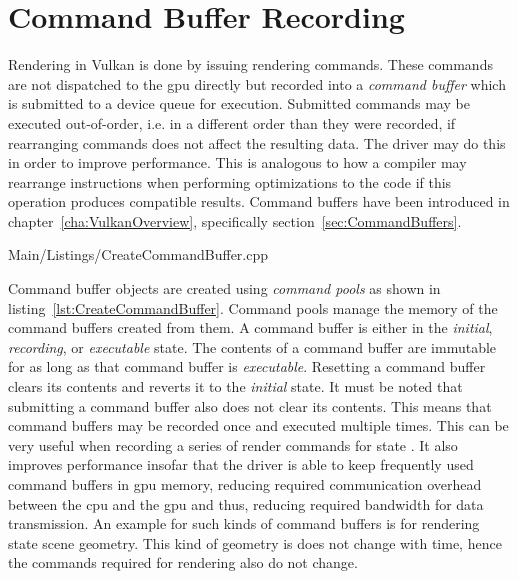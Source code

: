   \section{Command Buffer Recording}
  \label{sec:BuildCommandBuffers}
    Rendering in Vulkan is done by issuing rendering commands.
    These commands are not dispatched to the \gls{gpu} directly but recorded into a \textit{command buffer} which is submitted to a device queue for execution.
    Submitted commands may be executed out-of-order, i.e. in a different order than they were recorded, if rearranging commands does not affect the resulting data.
    The \gls{driver} may do this in order to improve performance.
    This is analogous to how a compiler may rearrange instructions when performing optimizations to the code if this operation produces compatible results.
    Command buffers have been introduced in chapter~\ref{cha:VulkanOverview}, specifically section~\ref{sec:CommandBuffers}.

    
    {Main/Listings/CreateCommandBuffer.cpp}

    Command buffer objects are created using \textit{command pools} as shown in listing~\ref{lst:CreateCommandBuffer}.
    Command pools manage the memory of the command buffers created from them.
    A command buffer is either in the \textit{initial}, \textit{recording}, or \textit{executable} state.
    The contents of a command buffer are immutable for as long as that command buffer is \textit{executable}.
    Resetting a command buffer clears its contents and reverts it to the \textit{initial} state.
    It must be noted that submitting a command buffer also does not clear its contents.
    This means that command buffers may be recorded once and executed multiple times.
    This can be very useful when recording a series of render commands for state .
    It also improves performance insofar that the \gls{driver} is able to keep frequently used command buffers in \gls{gpu} memory, reducing required communication overhead between the \gls{cpu} and the \gls{gpu} and thus, reducing required bandwidth for data transmission.
    An example for such kinds of command buffers is for rendering state scene geometry.
    This kind of geometry is does not change with time, hence the commands required for rendering also do not change.

